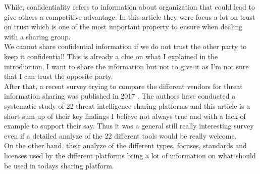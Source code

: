 \documentclass{eplmastersthesis}
\begin{document}
While, confidentiality refers to information about organization that could lead to give others a competitive advantage.
In this article they were focus a lot on trust on trust which is one of the most important property to ensure when dealing with a sharing group.\\
We cannot share confidential information if we do not trust the other party to keep it confidential! This is already a clue on what I explained in the introduction, I want to share the information but not to give it as I'm not sure that I can trust the opposite party.\\

After that, a recent survey trying to compare the different vendors for threat information sharing was published in 2017 \cite{sauerwein2017threat}. The authors have conducted a systematic study of 22 threat intelligence sharing platforms and this article is a short sum up of their key findings I believe not always true and with a lack of example to support their say. Thus it was a general still really interesting survey even if a detailed analyze of the 22 different tools would be really welcome.\\
On the other hand, their analyze of the different types, focuses, standards and licenses used by the different platforms bring a lot of information on what should be used in todays sharing platform.\\
\end{document}
